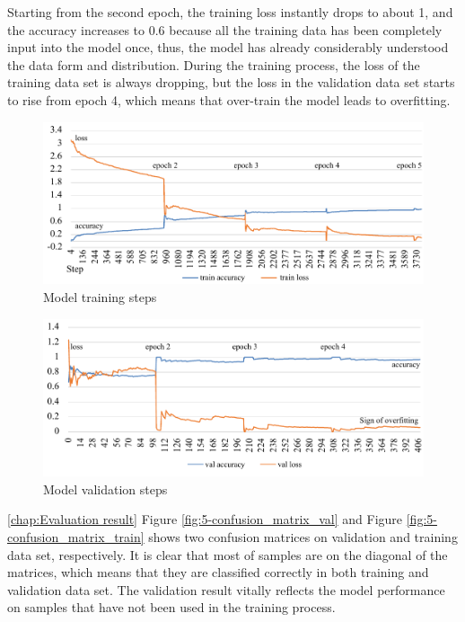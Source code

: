 Starting from the second epoch, the training loss instantly drops to about 1, and the accuracy increases to 0.6 because all the training data has been completely input into the model once, thus, the model has already considerably understood the data form and distribution.
During the training process, the loss of the training data set is always dropping, but the loss in the validation data set starts to rise from epoch 4, which means that over-train the model leads to overfitting.
\vspace*{-.5em}
\begin{figure}[!ht]
    \centering
    \includegraphics[width=.88\textwidth]{evaluation/imgs/5-train-step.pdf}
    \caption{Model training steps}
    \label{fig:5-train-step}
\end{figure}
\vspace*{-.5em}
\begin{figure}[!ht]
    \centering
    \includegraphics[width=.88\textwidth]{evaluation/imgs/5-val-steps.pdf}
    \caption{Model validation steps}
    \label{fig:5-val-steps}
\end{figure}

\ref{chap:Evaluation result} Figure \ref{fig:5-confusion_matrix_val} and Figure \ref{fig:5-confusion_matrix_train} shows two confusion matrices on validation and training data set, respectively.
It is clear that most of samples are on the diagonal of the matrices, which means that they are classified correctly in both training and validation data set.
The validation result vitally reflects the model performance on samples that have not been used in the training process.

